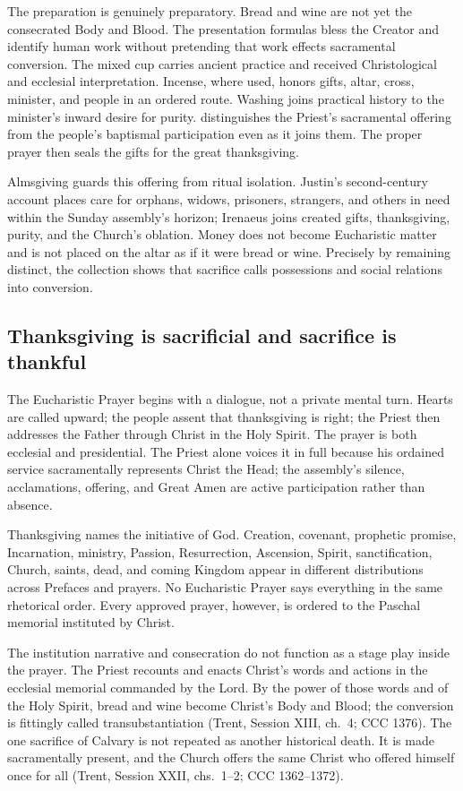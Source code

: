 The preparation is genuinely preparatory. Bread and wine are not yet the consecrated Body and Blood. The presentation formulas bless the Creator and identify human work without pretending that work effects sacramental conversion. The mixed cup carries ancient practice and received Christological and ecclesial interpretation. Incense, where used, honors gifts, altar, cross, minister, and people in an ordered route. Washing joins practical history to the minister's inward desire for purity.  distinguishes the Priest's sacramental offering from the people's baptismal participation even as it joins them. The proper prayer then seals the gifts for the great thanksgiving.

Almsgiving guards this offering from ritual isolation. Justin's second-century account places care for orphans, widows, prisoners, strangers, and others in need within the Sunday assembly's horizon; Irenaeus joins created gifts, thanksgiving, purity, and the Church's oblation. Money does not become Eucharistic matter and is not placed on the altar as if it were bread or wine. Precisely by remaining distinct, the collection shows that sacrifice calls possessions and social relations into conversion.

\subsection{Thanksgiving is sacrificial and sacrifice is thankful}

The Eucharistic Prayer begins with a dialogue, not a private mental turn. Hearts are called upward; the people assent that thanksgiving is right; the Priest then addresses the Father through Christ in the Holy Spirit. The prayer is both ecclesial and presidential. The Priest alone voices it in full because his ordained service sacramentally represents Christ the Head; the assembly's silence, acclamations, offering, and Great Amen are active participation rather than absence.

Thanksgiving names the initiative of God. Creation, covenant, prophetic promise, Incarnation, ministry, Passion, Resurrection, Ascension, Spirit, sanctification, Church, saints, dead, and coming Kingdom appear in different distributions across Prefaces and prayers. No Eucharistic Prayer says everything in the same rhetorical order. Every approved prayer, however, is ordered to the Paschal memorial instituted by Christ.

The institution narrative and consecration do not function as a stage play inside the prayer. The Priest recounts and enacts Christ's words and actions in the ecclesial memorial commanded by the Lord. By the power of those words and of the Holy Spirit, bread and wine become Christ's Body and Blood; the conversion is fittingly called transubstantiation (Trent, Session XIII, ch.~4; CCC 1376). The one sacrifice of Calvary is not repeated as another historical death. It is made sacramentally present, and the Church offers the same Christ who offered himself once for all (Trent, Session XXII, chs.~1--2; CCC 1362--1372).

